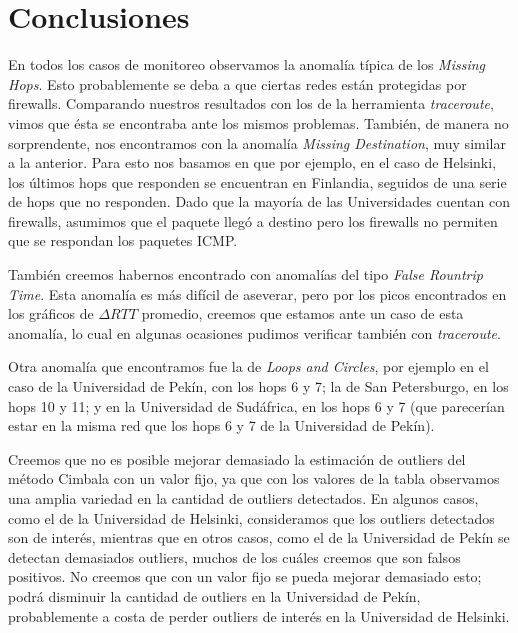 \section{Conclusiones}

En todos los casos de monitoreo observamos la anomalía típica de los \textit{Missing Hops}. Esto probablemente se deba a que ciertas redes están protegidas por firewalls. Comparando nuestros resultados con los de la herramienta \textit{traceroute}, vimos que ésta se encontraba ante los mismos problemas. También, de manera no sorprendente, nos encontramos con la anomalía \textit{Missing Destination}, muy similar a la anterior. Para esto nos basamos en que por ejemplo, en el caso de Helsinki, los últimos hops que responden se encuentran en Finlandia, seguidos de una serie de hops que no responden. Dado que la mayoría de las Universidades cuentan con firewalls, asumimos que el paquete llegó a destino pero los firewalls no permiten que se respondan los paquetes ICMP.

También creemos habernos encontrado con anomalías del tipo \textit{False Rountrip Time}. Esta anomalía es más difícil de aseverar, pero por los picos encontrados en los gráficos de $\Delta RTT$ promedio, creemos que estamos ante un caso de esta anomalía, lo cual en algunas ocasiones pudimos verificar también con \textit{traceroute}.

Otra anomalía que encontramos fue la de \textit{Loops and Circles}, por ejemplo en el caso de la Universidad de Pekín, con los hops 6 y 7; la de San Petersburgo, en los hops 10 y 11; y en la Universidad de Sudáfrica, en los hops 6 y 7 (que parecerían estar en la misma red que los hops 6 y 7 de la Universidad de Pekín).

Creemos que no es posible mejorar demasiado la estimación de outliers del método Cimbala con un valor fijo, ya que con los valores de la tabla observamos una amplia variedad en la cantidad de outliers detectados. En algunos casos, como el de la Universidad de Helsinki, consideramos que los outliers detectados son de interés, mientras que en otros casos, como el de la Universidad de Pekín se detectan demasiados outliers, muchos de los cuáles creemos que son falsos positivos. No creemos que con un valor fijo se pueda mejorar demasiado esto; podrá disminuir la cantidad de outliers en la Universidad de Pekín, probablemente a costa de perder outliers de interés en la Universidad de Helsinki.